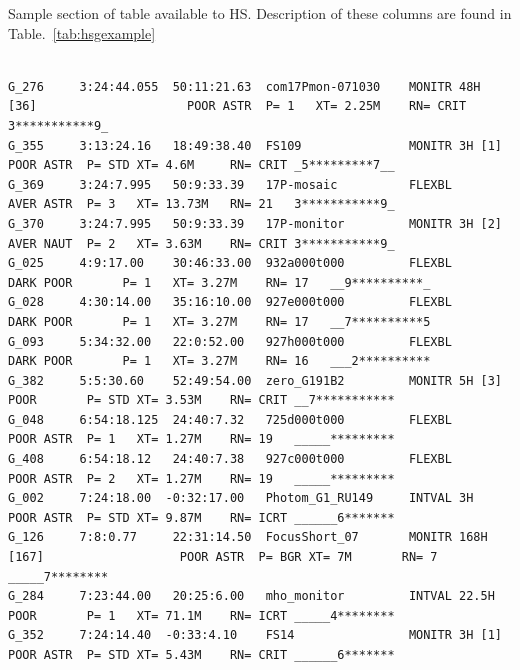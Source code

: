 \begin{landscape}

\begin{table}[h!]
  \begin{center}
  \end{center}
  \caption{Sample section of table available to HS. Description of these columns are found in Table.~\ref{tab:hsgexample}}
  \label{tab:example_gen}
\end{table}

\scriptsize
\begin{verbatim}

G_276     3:24:44.055  50:11:21.63  com17Pmon-071030    MONITR 48H [36]                     POOR ASTR  P= 1   XT= 2.25M    RN= CRIT 3***********9_
G_355     3:13:24.16   18:49:38.40  FS109               MONITR 3H [1]                       POOR ASTR  P= STD XT= 4.6M     RN= CRIT _5*********7__
G_369     3:24:7.995   50:9:33.39   17P-mosaic          FLEXBL                              AVER ASTR  P= 3   XT= 13.73M   RN= 21   3***********9_
G_370     3:24:7.995   50:9:33.39   17P-monitor         MONITR 3H [2]                       AVER NAUT  P= 2   XT= 3.63M    RN= CRIT 3***********9_
G_025     4:9:17.00    30:46:33.00  932a000t000         FLEXBL                         DARK POOR       P= 1   XT= 3.27M    RN= 17   __9**********_
G_028     4:30:14.00   35:16:10.00  927e000t000         FLEXBL                         DARK POOR       P= 1   XT= 3.27M    RN= 17   __7**********5
G_093     5:34:32.00   22:0:52.00   927h000t000         FLEXBL                         DARK POOR       P= 1   XT= 3.27M    RN= 16   ___2**********
G_382     5:5:30.60    52:49:54.00  zero_G191B2         MONITR 5H [3]                       POOR       P= STD XT= 3.53M    RN= CRIT __7***********
G_048     6:54:18.125  24:40:7.32   725d000t000         FLEXBL                              POOR ASTR  P= 1   XT= 1.27M    RN= 19   _____*********
G_408     6:54:18.12   24:40:7.38   927c000t000         FLEXBL                              POOR ASTR  P= 2   XT= 1.27M    RN= 19   _____*********
G_002     7:24:18.00  -0:32:17.00   Photom_G1_RU149     INTVAL 3H                           POOR ASTR  P= STD XT= 9.87M    RN= ICRT ______6*******
G_126     7:8:0.77     22:31:14.50  FocusShort_07       MONITR 168H [167]                   POOR ASTR  P= BGR XT= 7M       RN= 7    _____7********
G_284     7:23:44.00   20:25:6.00   mho_monitor         INTVAL 22.5H                        POOR       P= 1   XT= 71.1M    RN= ICRT _____4********
G_352     7:24:14.40  -0:33:4.10    FS14                MONITR 3H [1]                       POOR ASTR  P= STD XT= 5.43M    RN= CRIT ______6*******

\end{verbatim}
\end{landscape}
